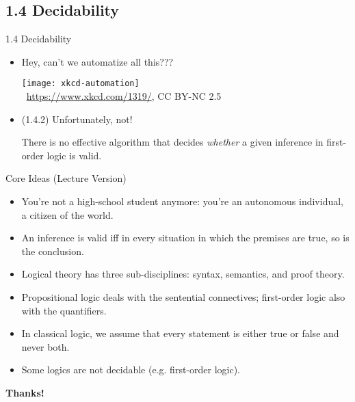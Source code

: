 \subsection{1.4 Decidability}
\begin{frame}{1.4 Decidability}

	\begin{itemize}

		\item Hey, can't we automatize all this???

		\begin{center}
					\texttt{[image: xkcd-automation]}\\[-1.8ex]
					{\tiny \textcopyright~\url{https://www.xkcd.com/1319/}, CC BY-NC 2.5}
		\end{center}

		\item (1.4.2) Unfortunately, not!

			\begin{theorem} There is no effective algorithm that decides \emph{whether} a given inference in first-order logic is valid.

			\end{theorem}

	\end{itemize}

\end{frame}

\begin{frame}{Core Ideas (Lecture Version)}

\begin{itemize}

		\item You're not a high-school student anymore: you're an autonomous individual, a citizen of the world.

		\item An inference is valid iff in every situation in which the premises are true, so is the conclusion.

		\item Logical theory has three sub-disciplines: syntax, semantics, and proof theory.

		\item Propositional logic deals with the sentential connectives; first-order logic also with the quantifiers.

		\item In classical logic, we assume that every statement is either true or false and never both.

		\item Some logics are not decidable (e.g. first-order logic).

	\end{itemize}


\end{frame}

\begin{frame}

	\begin{center}
	{\huge\bf Thanks!}
	\end{center}

\end{frame}
